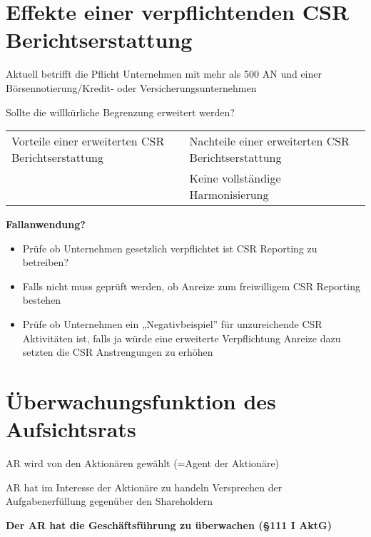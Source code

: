 \documentclass[
]{article}
\providecommand{\tightlist}{%
  \setlength{\itemsep}{0pt}\setlength{\parskip}{0pt}}
\begin{document}
\hypertarget{effekte-einer-verpflichtenden-csr-berichtserstattung}{%
\section{Effekte einer verpflichtenden CSR
Berichtserstattung}\label{effekte-einer-verpflichtenden-csr-berichtserstattung}}

Aktuell betrifft die Pflicht Unternehmen mit mehr als 500 AN und einer
Börsennotierung/Kredit- oder Versicherungsunternehmen

Sollte die willkürliche Begrenzung erweitert werden?

\begin{longtable}[]{@{}
  >{\raggedright\arraybackslash}p{}
  >{\raggedright\arraybackslash}p{}@{}}
\toprule
\endhead
Vorteile einer erweiterten CSR Berichtserstattung & Nachteile einer
erweiterten CSR Berichtserstattung \\
& Keine vollständige Harmonisierung \\
\bottomrule
\end{longtable}

\textbf{Fallanwendung?}

\begin{itemize}
\tightlist
\item
  Prüfe ob Unternehmen gesetzlich verpflichtet ist CSR Reporting zu
  betreiben?
\item
  Falls nicht muss geprüft werden, ob Anreize zum freiwilligem CSR
  Reporting bestehen
\item
  Prüfe ob Unternehmen ein „Negativbeispiel'' für unzureichende CSR
  Aktivitäten ist, falls ja würde eine erweiterte Verpflichtung Anreize
  dazu setzten die CSR Anstrengungen zu erhöhen
\end{itemize}

\hypertarget{uxfcberwachungsfunktion-des-aufsichtsrats}{%
\section{Überwachungsfunktion des
Aufsichtsrats}\label{uxfcberwachungsfunktion-des-aufsichtsrats}}

AR wird von den Aktionären gewählt (=Agent der Aktionäre)

AR hat im Interesse der Aktionäre zu handeln Versprechen der
Aufgabenerfüllung gegenüber den Shareholdern

\textbf{Der AR hat die Geschäftsführung zu überwachen (§111 I AktG)}
\end{document}
